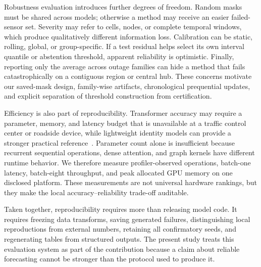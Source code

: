 \documentclass[preprint,12pt]{elsarticle}
\begin{document}
Robustness evaluation introduces further degrees of freedom. Random masks must
be shared across models; otherwise a method may receive an easier failed-sensor
set. Severity may refer to cells, nodes, or complete temporal windows, which
produce qualitatively different information loss. Calibration can be static,
rolling, global, or group-specific. If a test residual helps select its own
interval quantile or abstention threshold, apparent reliability is optimistic.
Finally, reporting only the average across outage families can hide a method
that fails catastrophically on a contiguous region or central hub. These
concerns motivate our saved-mask design, family-wise artifacts, chronological
prequential updates, and explicit separation of threshold construction from
certification.

Efficiency is also part of reproducibility. Transformer accuracy may require a
parameter, memory, and latency budget that is unavailable at a traffic control
center or roadside device, while lightweight identity models can provide a
stronger practical reference~\cite{shao2022stid,liu2023staeformer}. Parameter
count alone is insufficient because recurrent sequential operations, dense
attention, and graph kernels have different runtime behavior. We therefore
measure profiler-observed operations, batch-one latency, batch-eight
throughput, and peak allocated GPU memory on one disclosed platform. These
measurements are not universal hardware rankings, but they make the local
accuracy--reliability trade-off auditable.

Taken together, reproducibility requires more than releasing model code. It
requires freezing data transforms, saving generated failures, distinguishing
local reproductions from external numbers, retaining all confirmatory seeds,
and regenerating tables from structured outputs. The present study treats this
evaluation system as part of the contribution because a claim about reliable
forecasting cannot be stronger than the protocol used to produce it.
\end{document}
